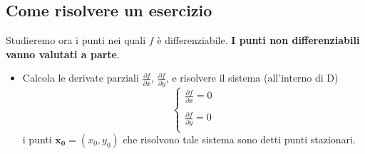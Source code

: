 \documentclass[a4paper,12pt]{article}
\begin{document}
\subsection{Come risolvere un esercizio}
Studieremo ora i punti nei quali $f$ è differenziabile. \textbf{I punti non differenziabili vanno valutati a parte}.
\begin{itemize}
\item Calcola le derivate parziali $\frac{\partial f}{\partial x}$, $\frac{\partial f}{\partial y}$, e risolvere il sistema (all'interno di D)
\begin{displaymath}
\left\{ \begin{array}{ll}
\frac{\partial f}{\partial x}=0\\
\\
\frac{\partial f}{\partial y}=0\\
\end{array} \right.
\end{displaymath}
i punti $\boldsymbol{x_0}=(x_0,y_0)$ che risolvono tale sistema sono detti punti stazionari.


\end{itemize}
\end{document}
